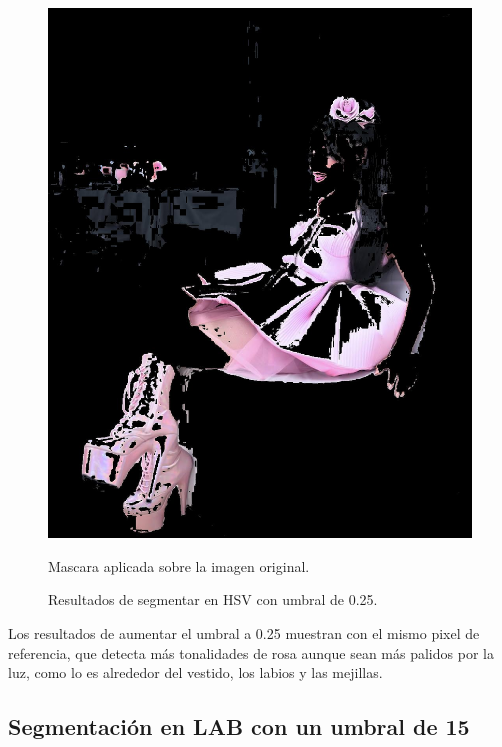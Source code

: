 \documentclass[11pt, letterpaper]{article}
\begin{document}
\begin{figure}[h!]
\begin{minipage}{0.4\textwidth}
		\includegraphics[width=\textwidth]{IMG/R23.jpg}
		\caption*{Mascara aplicada sobre la imagen original.}
	\end{minipage}
	\caption{Resultados de segmentar en HSV con umbral de 0.25.}
	\label{fig:f3}
\end{figure}

Los resultados de aumentar el umbral a 0.25 muestran con el mismo pixel de referencia, que detecta más tonalidades de rosa aunque sean más palidos por la luz, como lo es alrededor del vestido, los labios y las mejillas.

\newpage

\subsection{Segmentación en LAB con un umbral de 15}
\end{document}
